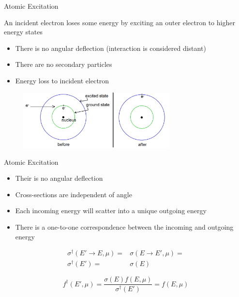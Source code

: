 \documentclass{beamer}
\begin{document}
    \begin{frame}{Atomic Excitation}

  \begin{block}{An incident electron loses some energy by exciting an outer electron to higher energy states}
    \begin{itemize}
      \item There is no angular deflection (interaction is considered distant)
      \item There are no secondary particles
      \item Energy loss to incident electron
    \end{itemize}
  \end{block}
  
    \begin{figure}
     \includegraphics[width=80mm]{excitation.png}
   \end{figure}

\end{frame}

\begin{frame}{Atomic Excitation}
	\begin{itemize}
	\item Their is no angular deflection
	\item Cross-sections are independent of angle
	\item Each incoming energy will scatter into a unique outgoing energy
	\item There is a one-to-one correspondence between the incoming and outgoing energy
	\end{itemize}

\begin{align}
\sigma^{\dagger}(E' \rightarrow E, \mu) = &\sigma(E \rightarrow E', \mu) = \nonumber \\
\sigma^{\dagger}(E') = &\sigma(E)
\end{align}

\begin{equation}
f^{\dagger}(E', \mu) = \frac{\sigma(E)f(E, \mu)}{\sigma^{\dagger}(E')} = f(E, \mu)
\end{equation}

\end{frame}
\end{document}

